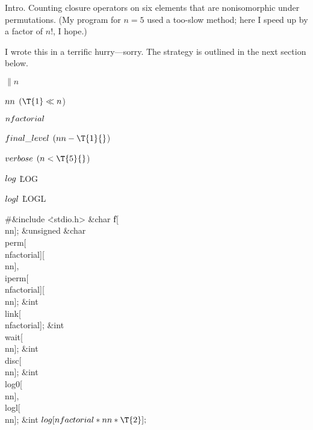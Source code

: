 
\datethis


Intro. Counting closure operators on six elements that are
nonisomorphic
under permutations. (My program for $n=5$ used a too-slow method;
here I speed up by a factor of $n!$, I hope.)

I wrote this in a terrific hurry---sorry. The strategy is outlined
in the next section below.

\Y\B\4\D$\|n$ \5
\par
\B\4\D$\\{nn}$ \5
$(\T{1}\LL\|n{}$)\par
\B\4\D$\\{nfactorial}$ \5
\par
\B\4\D$\\{final\_level}$ \5
$(\\{nn}-\T{1}{}$)\par
\B\4\D$\\{verbose}$ \5
$(\|n<\T{5}{}$)\par
\B\4\D$\\{log}$ \5
\.{LOG}\par
\B\4\D$\\{logl}$ \5
\.{LOGL}\par
\Y\B\8\#\&{include} \.{<stdio.h>}\6
\ATH\7
\&{char} \|f[\\{nn}];\6
\&{unsigned} \&{char} \\{perm}[\\{nfactorial}][\\{nn}]${},{}$ \\{iperm}[%
\\{nfactorial}][\\{nn}];\6
\&{int} \\{link}[\\{nfactorial}];\6
\&{int} \\{wait}[\\{nn}];\6
\&{int} \\{disc}[\\{nn}];\6
\&{int} \\{log0}[\\{nn}]${},{}$ \\{logl}[\\{nn}];\6
\&{int} ${}\\{log}[\\{nfactorial}*\\{nn}*\T{2}];{}$\6
